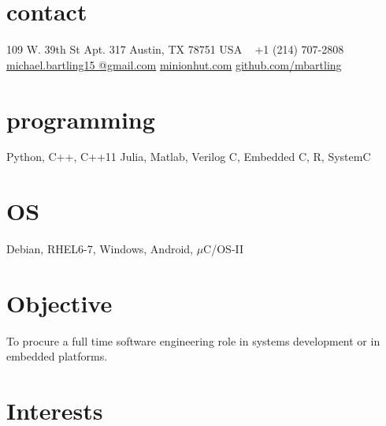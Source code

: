 \documentclass[]{friggeri-cv} %
\begin{document}

\begin{aside} %
\section{contact}
109 W. 39th St
Apt. 317
Austin, TX 78751
USA
~
+1 (214) 707-2808
~
\href{mailto:michael.bartling15@gmail.com}{michael.bartling15
@gmail.com}
\href{http://www.minionhut.com}{minionhut.com}
\href{http://github.com/mbartling}{github.com/mbartling}
\section{programming}
{%
Python, C++, C++11
Julia, Matlab, Verilog
C, Embedded C, R, SystemC}
\section{OS}
Debian, RHEL6-7,
Windows, Android,
$\mu$C/OS-II
\end{aside}

\section{Objective}
To procure a full time software engineering role in systems development or in embedded platforms.
\section{Interests}
\end{document}
